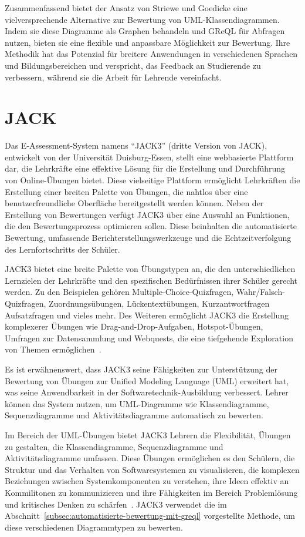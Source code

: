 Zusammenfassend bietet der Ansatz von Striewe und Goedicke eine vielversprechende Alternative zur Bewertung von UML-Klassendiagrammen. Indem sie diese Diagramme als Graphen behandeln und \ac{GReQL} für Abfragen nutzen, bieten sie eine flexible und anpassbare Möglichkeit zur Bewertung. Ihre Methodik hat das Potenzial für breitere Anwendungen in verschiedenen Sprachen und Bildungsbereichen und verspricht, das Feedback an Studierende zu verbessern, während sie die Arbeit für Lehrende vereinfacht.


\section{JACK}

Das E-Assessment-System namens ``JACK3'' (dritte Version von JACK)\cite{jack}, entwickelt von der Universität
Duisburg-Essen, stellt eine webbasierte Plattform dar, die Lehrkräfte eine effektive Lösung für die Erstellung und
Durchführung von Online-Übungen bietet. Diese vielseitige Plattform ermöglicht Lehrkräften die Erstellung einer breiten
Palette von Übungen, die nahtlos über eine benutzerfreundliche Oberfläche bereitgestellt werden können. Neben der
Erstellung von Bewertungen verfügt JACK3 über eine Auswahl an Funktionen, die den Bewertungsprozess optimieren sollen.
Diese beinhalten die automatisierte Bewertung, umfassende Berichterstellungswerkzeuge und die Echtzeitverfolgung des
Lernfortschritts der Schüler.

JACK3 bietet eine breite Palette von Übungstypen an, die den unterschiedlichen Lernzielen der Lehrkräfte und den
spezifischen Bedürfnissen ihrer Schüler gerecht werden. Zu den Beispielen gehören Multiple-Choice-Quizfragen,
Wahr/Falsch-Quizfragen, Zuordnungsübungen, Lückentextübungen, Kurzantwortfragen Aufsatzfragen und vieles mehr. Des
Weiteren ermöglicht JACK3 die Erstellung komplexerer Übungen wie Drag-and-Drop-Aufgaben, Hotspot-Übungen, Umfragen zur
Datensammlung und Webquests, die eine tiefgehende Exploration von Themen ermöglichen~\cite{jack}.

Es ist erwähnenswert, dass JACK3 seine Fähigkeiten zur Unterstützung der Bewertung von Übungen zur Unified Modeling
Language (UML) erweitert hat, was seine Anwendbarkeit in der Softwaretechnik-Ausbildung verbessert. Lehrer können das
System nutzen, um UML-Diagramme wie Klassendiagramme, Sequenzdiagramme und Aktivitätsdiagramme automatisch zu bewerten.

Im Bereich der UML-Übungen bietet JACK3 Lehrern die Flexibilität, Übungen zu gestalten, die Klassendiagramme,
Sequenzdiagramme und Aktivitätsdiagramme umfassen. Diese Übungen ermöglichen es den Schülern, die Struktur und das
Verhalten von Softwaresystemen zu visualisieren, die komplexen Beziehungen zwischen Systemkomponenten zu verstehen,
ihre Ideen effektiv an Kommilitonen zu kommunizieren und ihre Fähigkeiten im Bereich Problemlösung und kritisches
Denken zu schärfen~\cite{jack}. JACK3 verwendet die im Abschnitt~\ref{subsec:automatisierte-bewertung-mit-greql}
vorgestellte Methode, um diese verschiedenen Diagrammtypen zu bewerten.



